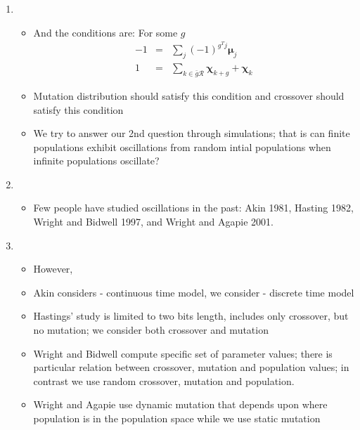 \documentclass{article}
\begin{document}
\begin{enumerate}
\item
  \begin{itemize}
  \item And the conditions are: For some $g$
  \begin{eqnarray*}
      -1 &=& \sum \limits_{j} (-1)^{g^T j} \bm{\mu}_j \\
      1 &=& \sum \limits_{k \in \bar{g}\mathcal{R}} \bm{\chi}_{k+g} + \bm{\chi}_k 
      \end{eqnarray*}
  \item Mutation distribution should satisfy this condition and crossover should satisfy this condition
  \item We try to answer our 2nd question through simulations; that is can finite populations exhibit
     oscillations from random intial populations when infinite populations oscillate?
  \end{itemize}
    
\item
  \begin{itemize}
    \item Few people have studied oscillations in the past: Akin 1981, Hasting 1982, Wright and Bidwell 1997, and Wright and Agapie 2001.
  \end{itemize}

    
\item
  \begin{itemize}
  \item  However,
  \item Akin considers - continuous time model, we consider -
    discrete time model
   \item Hastings' study is limited to two bits length, includes only
     crossover, but no mutation; we consider both crossover and mutation
  \item Wright and Bidwell compute specific set of parameter values; there is particular relation between crossover, mutation and population values; in contrast we use random crossover, mutation and population.
  \item Wright and Agapie use dynamic mutation that depends upon
    where population is in the population space while we use static
    mutation
  \end{itemize}


\end{enumerate}
\end{document}

